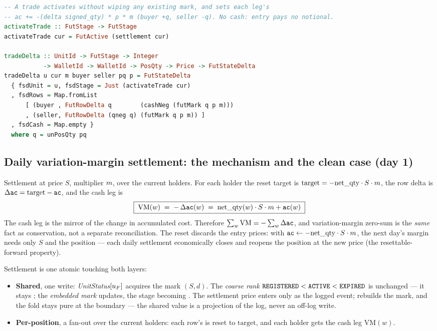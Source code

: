 \begin{lstlisting}[language=Haskell]
-- A trade activates without wiping any existing mark, and sets each leg's
-- ac += -(delta signed_qty) * p * m (buyer +q, seller -q). No cash: entry pays no notional.
activateTrade :: FutStage -> FutStage
activateTrade cur = FutActive (settlement cur)

tradeDelta :: UnitId -> FutStage -> Integer
           -> WalletId -> WalletId -> PosQty -> Price -> FutStateDelta
tradeDelta u cur m buyer seller pq p = FutStateDelta
  { fsdUnit = u, fsdStage = Just (activateTrade cur)
  , fsdRows = Map.fromList
      [ (buyer , FutRowDelta q        (cashNeg (futMark q p m)))
      , (seller, FutRowDelta (qneg q) (futMark q p m)) ]
  , fsdCash = Map.empty }
  where q = unPosQty pq
\end{lstlisting}

\subsection{Daily variation-margin settlement: the mechanism and the clean case (day 1)}
\label{sec:settle-mech}

Settlement at price $S$, multiplier $m$, over the current holders. For each holder the reset
target is $\mathrm{target}=-\mathrm{net\_qty}\cdot S\cdot m$, the row delta is $\Delta\texttt{ac}=\mathrm{target}-\texttt{ac}$,
and the cash leg is
\[
\boxed{\;\mathrm{VM}(w) \;=\; -\,\Delta\texttt{ac}(w) \;=\; \mathrm{net\_qty}(w)\cdot S\cdot m + \texttt{ac}(w)\;}
\]
The cash leg is the mirror of the change in accumulated cost. Therefore
$\sum_w\mathrm{VM} = -\sum_w\Delta\texttt{ac}$, and variation-margin zero-sum is the \emph{same} fact as \ac{}
conservation, not a separate reconciliation. The reset discards the entry prices: with
$\texttt{ac}\leftarrow-\mathrm{net\_qty}\cdot S\cdot m$, the next day's margin needs only $S$ and the position --- each
daily settlement economically closes and reopens the position at the new price (the resettable-forward
property).

Settlement is one atomic  touching both layers:
\begin{itemize}
\item \textbf{Shared}, one write: \emph{UnitStatus}$[u_{F}]$ acquires the mark $(S,d)$. The
\emph{coarse rank} $\texttt{REGISTERED}<\texttt{ACTIVE}<\texttt{EXPIRED}$ is unchanged --- it stays
; the \emph{embedded mark} updates, the stage becoming
. The settlement price enters only as the logged
 event;  rebuilds the mark, and the fold stays pure at the boundary --- the
shared value is a projection of the log, never an off-log write.
\item \textbf{Per-position}, a fan-out over the current holders: each row's \ac{} is reset to
$\mathrm{target}$, and each holder gets the cash leg $\mathrm{VM}(w)$.
\end{itemize}


